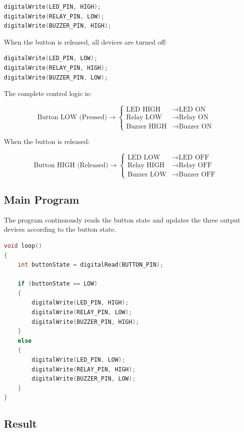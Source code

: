 \documentclass[12pt,a4paper]{article}
\begin{document}
\begin{lstlisting}[language=C]
digitalWrite(LED_PIN, HIGH);
digitalWrite(RELAY_PIN, LOW);
digitalWrite(BUZZER_PIN, HIGH);
\end{lstlisting}

When the button is released, all devices are turned off:

\begin{lstlisting}[language=C]
digitalWrite(LED_PIN, LOW);
digitalWrite(RELAY_PIN, HIGH);
digitalWrite(BUZZER_PIN, LOW);
\end{lstlisting}

The complete control logic is:

\[
\text{Button LOW (Pressed)}
\rightarrow
\begin{cases}
\text{LED HIGH} & \rightarrow \text{LED ON}\\
\text{Relay LOW} & \rightarrow \text{Relay ON}\\
\text{Buzzer HIGH} & \rightarrow \text{Buzzer ON}
\end{cases}
\]

When the button is released:

\[
\text{Button HIGH (Released)}
\rightarrow
\begin{cases}
\text{LED LOW} & \rightarrow \text{LED OFF}\\
\text{Relay HIGH} & \rightarrow \text{Relay OFF}\\
\text{Buzzer LOW} & \rightarrow \text{Buzzer OFF}
\end{cases}
\]

\subsection{Main Program}

The program continuously reads the button state and updates the three
output devices according to the button state.

\begin{lstlisting}[language=C]
void loop()
{
    int buttonState = digitalRead(BUTTON_PIN);

    if (buttonState == LOW)
    {
        digitalWrite(LED_PIN, HIGH);
        digitalWrite(RELAY_PIN, LOW);
        digitalWrite(BUZZER_PIN, HIGH);
    }
    else
    {
        digitalWrite(LED_PIN, LOW);
        digitalWrite(RELAY_PIN, HIGH);
        digitalWrite(BUZZER_PIN, LOW);
    }
}
\end{lstlisting}

\subsection{Result}
\end{document}
